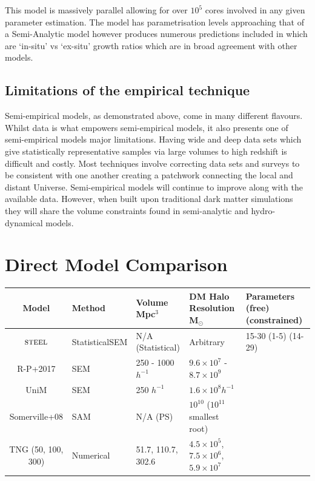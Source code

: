 This model is massively parallel allowing for over $10^{5}$ cores involved in any given parameter estimation. The model has parametrisation levels approaching that of a Semi-Analytic model however produces numerous predictions included in which are `in-situ' vs `ex-situ' growth ratios which are in broad agreement with other models.

\subsection{Limitations of the empirical technique}
Semi-empirical models, as demonstrated above, come in many different flavours. Whilst data is what empowers semi-empirical models, it also presents one of semi-empirical models major limitations. Having wide and deep data sets which give statistically representative samples via large volumes to high redshift is difficult and costly. Most techniques involve correcting data sets and surveys to be consistent with one another creating a patchwork connecting the local and distant Universe. Semi-empirical models will continue to improve along with the available data. However, when built upon traditional dark matter simulations they will share the volume constraints found in semi-analytic and hydro-dynamical models.


\section{Direct Model Comparison}

\begin{table}[]
\begin{tabularx}{\linewidth}{c|XXXX}
Model              & Method         & Volume Mpc$^3$ & DM Halo Resolution M$_{\odot}$                                        & Parameters (free) (constrained) \\ \hline \hline
$\textsc{steel}$           & StatisticalSEM & N/A (Statistical)             & Arbitrary & 15-30 (1-5) (14-29)             \\
R-P+2017           & SEM            & 250 - 1000 $h^{-1}$          & $9.6 \times 10^7$ - $8.7 \times 10^9$                             &                                 \\
UniM               & SEM            & 250 $h^{-1}$                  & $1.6\times10^8h^{-1}$                                                   &                                 \\
Somerville+08      & SAM            & N/A (PS)                      & $10^{10}$ ($10^{11}$ smallest root)                  &                                 \\
TNG (50, 100, 300) & Numerical      & 51.7, 110.7, 302.6            & $4.5\times10^5$, $7.5\times10^6$, $5.9\times 10^7$&                                
\end{tabularx}
\end{table}

